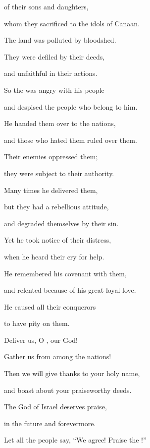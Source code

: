 {of their sons
and daughters,
\par }{\Q whom
they sacrificed
to the idols
of Canaan.
\par }{\Q The land
was polluted
by bloodshed.
\par }{\Q {}They were defiled
by their deeds,
\par }{\Q and unfaithful
in their actions.
\par }{\Q {}So the
{}
was angry
with his people
\par }{\Q and despised
the people who belong to him.
\par }{\Q {}He handed
them over
to the nations,
\par }{\Q and those who hated
them ruled over them.
\par }{\Q {}Their enemies
oppressed
them;
\par }{\Q they were subject
to their authority.
\par }{\Q {}Many
times
he delivered
them,
\par }{\Q but they
had
a rebellious
attitude,

\par }{\Q and degraded
themselves by their sin.
\par }{\Q {}Yet he took notice
of their distress,
\par }{\Q when he heard
their cry for help.
\par }{\Q {}He remembered
his covenant
with them,
\par }{\Q and relented
because of his great
loyal love.
\par }{\Q {}He caused
all
their conquerors
\par }{\Q to have pity on them.
\par }{\Q {}Deliver
us, O
{}, our God!
\par }{\Q Gather
us from
among the nations!
\par }{\Q Then we will give thanks
to your holy
name,
\par }{\Q and boast
about your praiseworthy deeds.
\par }{\Q {}The
{}
God
of Israel
deserves
praise,

\par }{\Q in the future
and forevermore.
\par }{\Q Let all
the people
say, “We agree! Praise
the
{}!”


\par }
